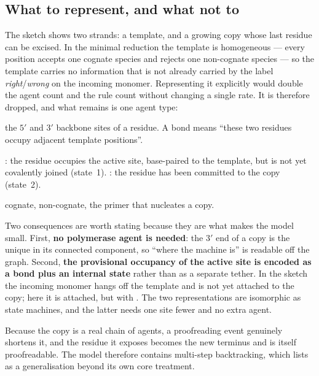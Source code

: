 \subsection{What to represent, and what not to}

The sketch shows two strands: a template, and a growing copy whose last residue can be
excised.  In the minimal reduction the template is homogeneous --- every position
accepts one cognate species and rejects one non-cognate species --- so the template
carries no information that is not already carried by the label
\emph{right}/\emph{wrong} on the incoming monomer.  Representing it explicitly would
double the agent count and the rule count without changing a single rate.  It is
therefore dropped, and what remains is one agent type:

\begin{center}\end{center}

\begin{description}\itemsep2pt
\item[\ka{p}, \ka{n}] the $5'$ and $3'$ backbone sites of a residue.  A bond
   means ``these two residues occupy adjacent template positions''.
\item[\ka{c}] : the residue occupies the active site, base-paired to the
  template, but is not yet covalently joined (state~1).  : the residue has
  been committed to the copy (state~2).
\item[\ka{k}]  cognate,  non-cognate,  the primer that
  nucleates a copy.
\end{description}

Two consequences are worth stating because they are what makes the model small.
First, \textbf{no polymerase agent is needed}: the $3'$ end of a copy is the unique
 in its connected component, so ``where the machine is'' is
readable off the graph.  Second, \textbf{the provisional occupancy of the active site
is encoded as a bond plus an internal state} rather than as a separate tether.  In the
sketch the incoming monomer hangs off the template and is not yet attached to the copy;
here it is attached, but with .  The two representations are isomorphic as
state machines, and the latter needs one site fewer and no extra agent.

Because the copy is a real chain of agents, a proofreading event genuinely shortens it,
and the residue it exposes becomes the new terminus and is itself proofreadable.  The
model therefore contains multi-step backtracking, which \cite{ps2016} lists as a
generalisation beyond its own core treatment.

